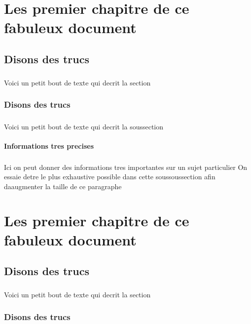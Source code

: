 \documentclass[a4paper,10pt,openany,oneside]{report}
\begin{document}
\chapter{Les premier chapitre de ce fabuleux document}

\section{Disons des trucs}
\paragraph{}
Voici un petit bout de texte qui decrit la section

\subsection{Disons des trucs}
\paragraph{}
Voici un petit bout de texte qui decrit la soussection

\subsubsection{Informations tres precises}
\paragraph{}
Ici on peut donner des informations tres importantes sur un sujet particulier On essaie detre le plus exhaustive possible dans cette soussoussection afin daaugmenter la taille de ce paragraphe

\chapter{Les premier chapitre de ce fabuleux document}

\section{Disons des trucs}
\paragraph{}
Voici un petit bout de texte qui decrit la section

\subsection{Disons des trucs}
\end{document}
